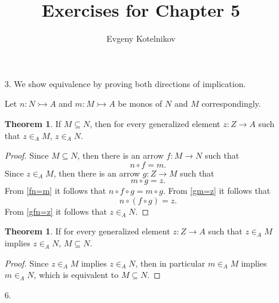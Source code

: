 \documentclass[12pt]{article}
\author{Evgeny Kotelnikov}
\title{Exercises for Chapter 5}
\date{}
\theoremstyle{definition}
\begin{document}
\maketitle

\begin{enumerate}
  \item[3.]
    We show equivalence by proving both directions of implication.

    Let $n : N \rightarrowtail A$ and $m : M \rightarrowtail A$ be monos of $N$ and $M$ correspondingly.

    \newtheorem*{a->b}{Theorem}
    \begin{a->b}If $M \subseteq N$, then for every generalized element $z : Z \to A$ such that $z \in_A M$, $z \in_A N$.\end{a->b}
    \begin{proof}
      Since $M \subseteq N$, then there is an arrow $f : M \to N$ such that \begin{equation}\label{fn=m}n \circ f = m.\end{equation} Since $z \in_A M$, then there is an arrow $g : Z \to M$ such that \begin{equation}\label{gm=z}m \circ g = z.\end{equation}
      From \ref{fn=m} it follows that $n \circ f \circ g = m \circ g$. From \ref{gm=z} it follows that \begin{equation}\label{gfn=z}n \circ (f \circ g) = z.\end{equation}
      From \ref{gfn=z} it follows that $z \in_A N$.
    \end{proof}

    \newtheorem*{b->a}{Theorem}
    \begin{b->a}If for every generalized element $z : Z \to A$ such that $z \in_A M$ implies $z \in_A N$, $M \subseteq N$.\end{b->a}
    \begin{proof}
      Since $z \in_A M$ implies $z \in_A N$, then in particular $m \in_A M$ implies $m \in_A N$, which is equivalent to $M \subseteq N$.
    \end{proof}

  \item[6.]
    \begin{figure}[h!]
      \centering
\end{figure}
\end{enumerate}
\end{document}
